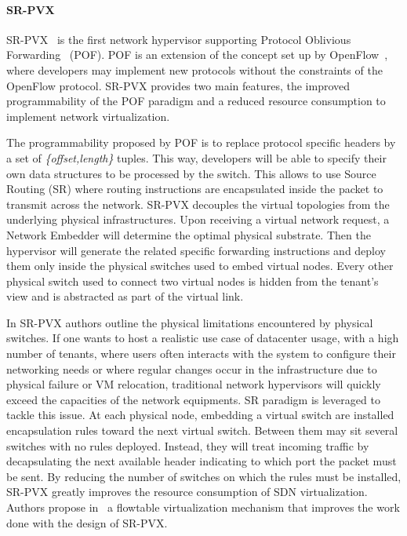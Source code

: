 \paragraph{SR-PVX}
SR-PVX~\cite{PVX-Li2017} is the first network hypervisor supporting Protocol Oblivious Forwarding~\cite{pof-song2013} (POF). POF is an extension of the concept set up by OpenFlow~\cite{Openflow-McKeown2008}, where developers may implement new protocols without the constraints of the OpenFlow protocol.
SR-PVX provides two main features, the improved programmability of the POF paradigm and a reduced resource consumption to implement network virtualization.

The programmability proposed by POF is to replace protocol specific headers by a set of \textit{\{offset,length\}} tuples. This way, developers will be able to specify their own data structures to be processed by the switch. This allows to use Source Routing (SR) where routing instructions are encapsulated inside the packet to transmit across the network.
SR-PVX decouples the virtual topologies from the underlying physical infrastructures.
Upon receiving a virtual network request, a Network Embedder will determine the optimal physical substrate. Then the hypervisor will generate the related specific forwarding instructions and deploy them only inside the physical switches used to embed virtual nodes. Every other physical switch used to connect two virtual nodes is hidden from the tenant's view and is abstracted as part of the virtual link.

In SR-PVX authors outline the physical limitations encountered by physical switches. If one wants to host a realistic use case of datacenter usage, with a high number of tenants, where users often interacts with the system to configure their networking needs or where regular changes occur in the infrastructure due to physical failure or VM relocation, traditional network hypervisors will quickly exceed the capacities of the network equipments. SR paradigm is leveraged to tackle this issue. At each physical node, embedding a virtual switch are installed encapsulation rules toward the next virtual switch. Between them may sit several switches with no rules deployed. Instead, they will treat incoming traffic by decapsulating the next available header indicating to which port the packet must be sent. By reducing the number of switches on which the rules must be installed, SR-PVX greatly improves the resource consumption of SDN virtualization. Authors propose in~\cite{pvflow-Li2018} a flowtable virtualization mechanism that improves the work done with the design of SR-PVX.


